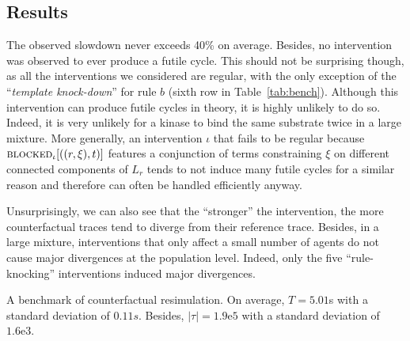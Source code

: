 \subsection{Results}

The observed slowdown never exceeds 40\% on average. Besides, no
intervention was observed to ever produce a futile cycle. This should
not be surprising though, as all the interventions we considered are
regular, with the only exception of the ``\textit{template
  knock-down}'' for rule $b$ (sixth row in
Table~\ref{tab:bench}). Although this intervention can produce futile
cycles in theory, it is highly unlikely to do so.  Indeed, it is very
unlikely for a kinase to bind the same substrate twice in a large
mixture. More generally, an intervention $\iota$ that fails to be
regular because ${\textsc{blocked}}_{\iota}[((r, \xi), t)]$ features a
conjunction of terms constraining $\xi$ on different connected
components of $L_r$ tends to not induce many futile cycles for a
similar reason and therefore can often be handled efficiently anyway.

Unsurprisingly, we can also see that the ``stronger'' the
intervention, the more counterfactual traces tend to diverge from
their reference trace. Besides, in a large mixture, interventions that
only affect a small number of agents do not cause major divergences at
the population level. Indeed, only the five ``rule-knocking''
interventions induced major divergences.





 \begin{table}\footnotesize
  \begin{center}
    
  \end{center}
  \caption{A benchmark of counterfactual resimulation. On average,
    $T = 5.01$s with a standard deviation of $0.11s$. Besides,
    $|\tau| = 1.9\mathrm{e}5$ with a standard deviation of
    $1.6\mathrm{e}3$.}\label{tab:bench}
\end{table}
